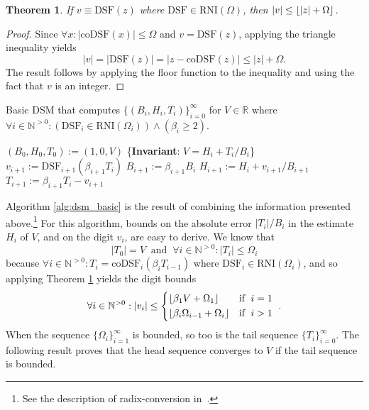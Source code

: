 \documentclass[10pt]{article}
\DeclarePairedDelimiter\floor{\lfloor}{\rfloor}
\newtheorem{thm}{Theorem}[section]
\theoremstyle{definition}
\theoremstyle{remark}
\numberwithin{equation}{section}
\newcommand{\assign}{:=}
\newcommand{\dsf}{\text{DSF}}
\newcommand{\codsf}{\text{coDSF}}
\newcommand{\rni}[1]{\text{RNI}({#1})}
\newcommand{\pnats}{\mathbb{N}^{>0}}
\newcommand{\reals}{\mathbb{R}}
\newcommand{\abs}[1]{\lvert #1 \rvert}
\begin{document}
\begin{thm} 
	\label{thm:arni_digit_bound}
	If $v \equiv \dsf(z)$ where $\dsf \in \rni{\Omega}$, then $\abs{v} \le \floor{\abs{z} + \Omega}$.
\end{thm}
\begin{proof}
	Since $\forall x: \abs{\codsf(x)} \le \Omega$ and $v = \dsf(z)$, applying the triangle inequality yields 
	\[
	\abs{v} = \abs{\dsf(z)} = \abs{z - \codsf(z)} \le \abs{z} + \Omega.
	\]
	The result follows by applying the floor function to the inequality and using the fact that $v$ is an integer. 
\end{proof}

\begin{algorithm}[t]
	\caption{Basic DSM that computes $\{(B_i, H_i, T_i)\}_{i=0}^\infty$ for $V \in \reals$ where $\forall i \in \pnats: (\dsf_i \in \rni{\Omega_i}) \wedge (\beta_i\ge2)$.\label{alg:dsm_basic}}
	\begin{algorithmic}[0] %
		\State $(B_0, H_0, T_0) \assign (1, 0, V)$
		\For{$i \assign 0,1,2,\ldots$}
        \State \{\textbf{Invariant}: $V = H_{i} + T_{i}/B_{i}$\}
		\State $v_{i+1} \assign \dsf_{i+1}(\beta_{i+1} T_{i})$
		\State $B_{i+1} \assign \beta_{i+1} B_{i}$
		\State $H_{i+1} \assign H_{i} + v_{i+1}/B_{i+1}$
		\State $T_{i+1} \assign \beta_{i+1}T_i - v_{i+1}$
		\EndFor
		\EndProcedure
	\end{algorithmic}
\end{algorithm}

Algorithm \ref{alg:dsm_basic} is the result of combining the information presented above.\footnote{See the description of radix-conversion in~\cite{KnuthArt2}.}
For this algorithm, bounds on the absolute error $\abs{T_i}/B_i$ in the estimate $H_i$ of $V$, and on the digit $v_i$, are easy to derive. We know that
\[ 
\abs{T_0} = V \;\;\mbox{and} \;\; \forall i \in \pnats: \abs{T_i} \le \Omega_i
\]
because $\forall i \in \pnats: T_i = \codsf_i(\beta_i T_{i-1})$ where $\dsf_i \in \rni{\Omega_i}$, and so applying Theorem \ref{thm:arni_digit_bound} yields the digit bounds
\begin{align*}
\forall i \in \pnats: \abs{v_i} \le \begin{cases*}
\floor{\beta_1 V + \Omega_1}            & \text{if}\; $i = 1$ \\
\floor{\beta_i \Omega_{i-1} + \Omega_i} & \text{if}\; $i > 1$
\end{cases*} .
\end{align*}
When the sequence $\{\Omega_i\}_{i=1}^\infty$ is bounded, so too is the tail sequence $\{T_i\}_{i=0}^\infty$. 
The following result proves that the head sequence converges to $V$ if the tail sequence is bounded. 
\end{document}

